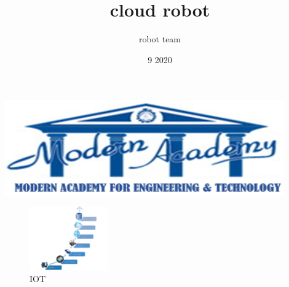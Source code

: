 \documentclass[12pt,A4]{article}
\title{cloud robot}
\author{robot team}
\date{9 2020}
\begin{document}
\begin{titlepage}
\maketitle
\end{titlepage}

\includegraphics[width=0.9\textwidth]{image1}
%

\tableofcontents



\listoffigures
\listoftables









\begin{figure}
    \centering
    \includegraphics[width=0.3\textwidth]{IOT}
    \caption{IOT}
\end{figure}
%

\printbibliography
\end{document}
